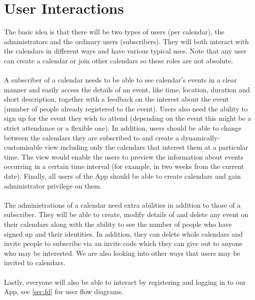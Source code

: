 \documentclass[10pt,a4paper]{article}
\begin{document}
\section{User Interactions} 
The basic idea is that there will be two types of users (per calendar), the administrators and the ordinary users (subscribers). They will both interact with the calendars in different ways and have various typical uses. Note that any user can create a calendar or join other calendars so these roles are not absolute.
\\
\\
\noindent
A subscriber of a calendar needs to be able to see calendar's events in a clear manner and easily access the details of an event, like time, location, duration and short description, together with a feedback on the interest about the event (number of people already registered to the event). Users also need the ability to sign up for the event they wish to attend (depending on the event this might be a strict attendance or a flexible one). In addition, users should be able to change between the calendars they are subscribed to and create a dynamically-customisable view including only the calendars that interest them at a particular time. The view would enable the users to preview the information about events occurring in a certain time interval (for example, in two weeks from the current date). Finally, all users of the App should be able to create calendars and gain administrator privilege on them. 
\\
\\
\noindent
The administrations of a calendar need extra abilities in addition to those of a subscriber. They will be able to create, modify details of and delete any event on their calendars along with the ability to see the number of people who have signed up and their identities. In addition, they can delete whole calendars and invite people to subscribe via an invite code which they can give out to anyone who may be interested. We are also looking into other ways that users may be invited to calendars.  
\\
\\
\noindent
Lastly, everyone will also be able to interact by registering and logging in to our App, see \cref{sec:fd} for user flow diagrams.

\appendix
\label{appendix}
\end{document}
